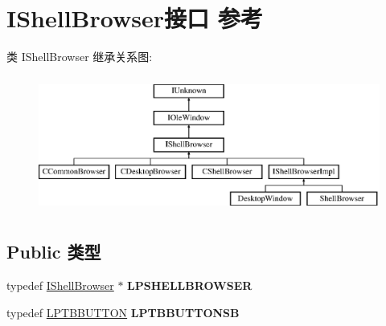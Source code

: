 \hypertarget{interface_i_shell_browser}{}\section{I\+Shell\+Browser接口 参考}
\label{interface_i_shell_browser}
类 I\+Shell\+Browser 继承关系图\+:\begin{figure}[H]
\begin{center}
\leavevmode
\includegraphics[height=4.516129cm]{interface_i_shell_browser}
\end{center}
\end{figure}
\subsection*{Public 类型}
\begin{DoxyCompactItemize}
\item 
\mbox{\label{interface_i_shell_browser_ae4e13f6156c997a1d9cfe6d73a48cfbc}} 
typedef \hyperlink{interface_i_shell_browser}{I\+Shell\+Browser} $\ast$ {\bfseries L\+P\+S\+H\+E\+L\+L\+B\+R\+O\+W\+S\+ER}
\item 
\mbox{\label{interface_i_shell_browser_a4bd345798de223cc59ae3c3486de0b84}} 
typedef \hyperlink{struct___t_b_b_u_t_t_o_n}{L\+P\+T\+B\+B\+U\+T\+T\+ON} {\bfseries L\+P\+T\+B\+B\+U\+T\+T\+O\+N\+SB}
\end{DoxyCompactItemize}
